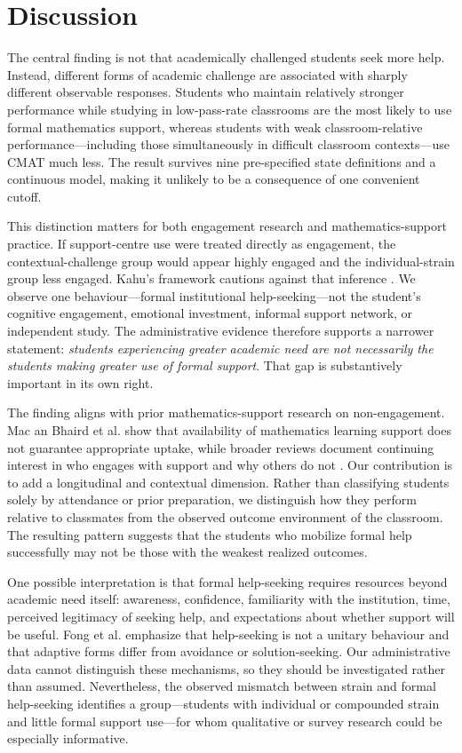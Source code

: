 \section{Discussion}

The central finding is not that academically challenged students seek more help. Instead, different forms of academic challenge are associated with sharply different observable responses. Students who maintain relatively stronger performance while studying in low-pass-rate classrooms are the most likely to use formal mathematics support, whereas students with weak classroom-relative performance---including those simultaneously in difficult classroom contexts---use CMAT much less. The result survives nine pre-specified state definitions and a continuous model, making it unlikely to be a consequence of one convenient cutoff.

This distinction matters for both engagement research and mathematics-support practice. If support-centre use were treated directly as engagement, the contextual-challenge group would appear highly engaged and the individual-strain group less engaged. Kahu's framework cautions against that inference \citep{kahu2013}. We observe one behaviour---formal institutional help-seeking---not the student's cognitive engagement, emotional investment, informal support network, or independent study. The administrative evidence therefore supports a narrower statement: \emph{students experiencing greater academic need are not necessarily the students making greater use of formal support}. That gap is substantively important in its own right.

The finding aligns with prior mathematics-support research on non-engagement. Mac an Bhaird et al. \citep{macanbhaird2013} show that availability of mathematics learning support does not guarantee appropriate uptake, while broader reviews document continuing interest in who engages with support and why others do not \citep{lawson2020,mullen2024}. Our contribution is to add a longitudinal and contextual dimension. Rather than classifying students solely by attendance or prior preparation, we distinguish how they perform relative to classmates from the observed outcome environment of the classroom. The resulting pattern suggests that the students who mobilize formal help successfully may not be those with the weakest realized outcomes.

One possible interpretation is that formal help-seeking requires resources beyond academic need itself: awareness, confidence, familiarity with the institution, time, perceived legitimacy of seeking help, and expectations about whether support will be useful. Fong et al. \citep{fong2023} emphasize that help-seeking is not a unitary behaviour and that adaptive forms differ from avoidance or solution-seeking. Our administrative data cannot distinguish these mechanisms, so they should be investigated rather than assumed. Nevertheless, the observed mismatch between strain and formal help-seeking identifies a group---students with individual or compounded strain and little formal support use---for whom qualitative or survey research could be especially informative.

